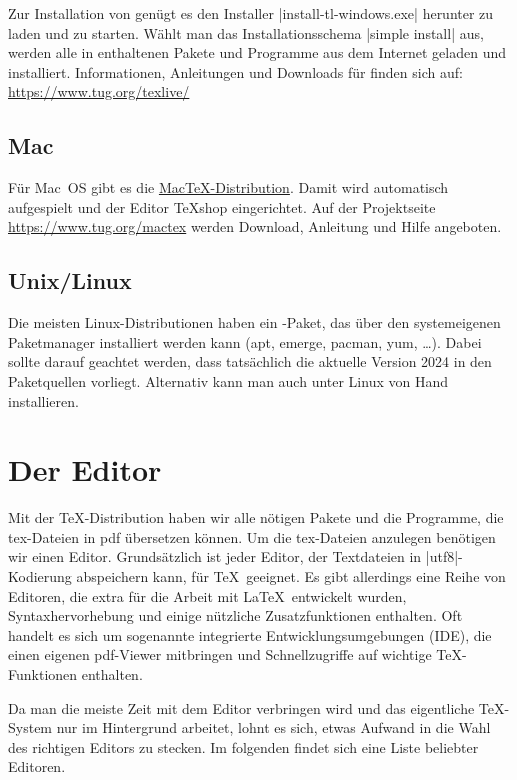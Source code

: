 \documentclass[
	ausgabe=2025-01-13,
	titel=Installationshinweise,
	shortverb=true,
]{../tex/latexkurs-exercise}
\begin{document}
Zur Installation von \TeXlive genügt es den Installer |install-tl-windows.exe| herunter zu laden und zu starten. Wählt man das Installationsschema |simple install| aus, werden alle in \TeXlive enthaltenen Pakete und Programme aus dem Internet geladen und installiert. Informationen, Anleitungen und Downloads für \TeXlive finden sich auf:\\ \url{https://www.tug.org/texlive/}


\subsection*{Mac}
Für Mac~OS gibt es die \href{https://www.tug.org/mactex}{Mac\TeX-Distribution}. Damit wird automatisch  \TeXlive aufgespielt und  der Editor \TeX shop eingerichtet. Auf der Projektseite \url{https://www.tug.org/mactex} werden Download, Anleitung und Hilfe angeboten.

\subsection*{Unix/Linux}
Die meisten Linux-Distributionen haben ein \TeXlive-Paket, das über den systemeigenen Paketmanager installiert werden kann (apt, emerge, pacman, yum, …).
Dabei sollte darauf geachtet werden, dass tatsächlich die aktuelle Version 2024 in den Paketquellen vorliegt. Alternativ kann man \TeXlive auch unter Linux von Hand installieren.



\section{Der Editor}

Mit der \TeX-Distribution haben wir alle nötigen Pakete und die Programme, die tex-Dateien in pdf übersetzen können. Um die tex-Dateien anzulegen benötigen wir einen Editor. Grundsätzlich ist jeder Editor, der Textdateien in |utf8|-Kodierung abspeichern kann, für \TeX\ geeignet. Es gibt allerdings eine Reihe von Editoren, die extra für die Arbeit mit \LaTeX\ entwickelt wurden, Syntaxhervorhebung und einige nützliche Zusatzfunktionen enthalten. Oft handelt es sich um sogenannte integrierte Entwicklungsumgebungen (IDE), die einen eigenen pdf-Viewer mitbringen und Schnellzugriffe auf wichtige \TeX-Funktionen enthalten.

Da man die meiste Zeit mit dem Editor verbringen wird und das eigentliche \TeX-System nur im Hintergrund arbeitet, lohnt es sich, etwas Aufwand in die Wahl des richtigen Editors zu stecken. Im folgenden findet sich eine Liste beliebter Editoren.
\end{document}
